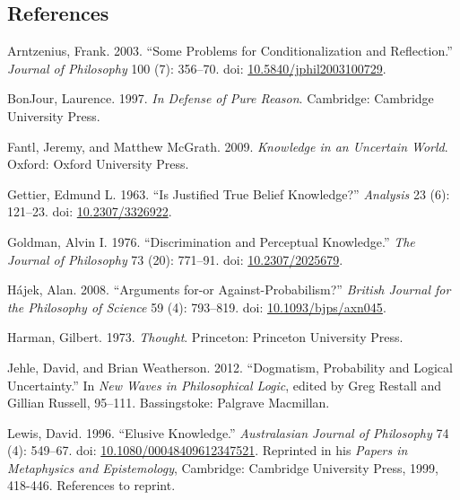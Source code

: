 \documentclass[
  11pt,
  letterpaper,
  DIV=11,
  numbers=noendperiod,
  twoside]{scrartcl}
\newlength{\cslhangindent}
\newenvironment{CSLReferences}[2] %
 {\begin{list}{}{%
  \setlength{\itemindent}{0pt}
  \setlength{\leftmargin}{0pt}
  \setlength{\parsep}{0pt}
  \ifodd #1
   \setlength{\leftmargin}{\cslhangindent}
   \setlength{\itemindent}{-1\cslhangindent}
  \fi
  \setlength{\itemsep}{#2\baselineskip}}}
 {\end{list}}
\begin{document}
\subsection*{References}\label{references}

\label{refs}
\begin{CSLReferences}{1}{0}
Arntzenius, Frank. 2003. {``Some Problems for Conditionalization and
Reflection.''} \emph{Journal of Philosophy} 100 (7): 356--70. doi:
\href{https://doi.org/10.5840/jphil2003100729}{10.5840/jphil2003100729}.

BonJour, Laurence. 1997. \emph{In Defense of Pure Reason}. Cambridge:
Cambridge University Press.

Fantl, Jeremy, and Matthew McGrath. 2009. \emph{Knowledge in an
Uncertain World}. Oxford: Oxford University Press.

Gettier, Edmund L. 1963. {``Is Justified True Belief Knowledge?''}
\emph{Analysis} 23 (6): 121--23. doi:
\href{https://doi.org/10.2307/3326922}{10.2307/3326922}.

Goldman, Alvin I. 1976. {``Discrimination and Perceptual Knowledge.''}
\emph{The Journal of Philosophy} 73 (20): 771--91. doi:
\href{https://doi.org/10.2307/2025679}{10.2307/2025679}.

Hájek, Alan. 2008. {``Arguments for-or Against-Probabilism?''}
\emph{British Journal for the Philosophy of Science} 59 (4): 793--819.
doi: \href{https://doi.org/10.1093/bjps/axn045}{10.1093/bjps/axn045}.

Harman, Gilbert. 1973. \emph{Thought}. Princeton: Princeton University
Press.

Jehle, David, and Brian Weatherson. 2012. {``Dogmatism, Probability and
Logical Uncertainty.''} In \emph{New Waves in Philosophical Logic},
edited by Greg Restall and Gillian Russell, 95--111. Bassingstoke:
Palgrave Macmillan.

Lewis, David. 1996. {``Elusive Knowledge.''} \emph{Australasian Journal
of Philosophy} 74 (4): 549--67. doi:
\href{https://doi.org/10.1080/00048409612347521}{10.1080/00048409612347521}.
Reprinted in his \emph{Papers in Metaphysics and Epistemology},
Cambridge: Cambridge University Press, 1999, 418-446. References to
reprint.


\end{CSLReferences}
\end{document}
